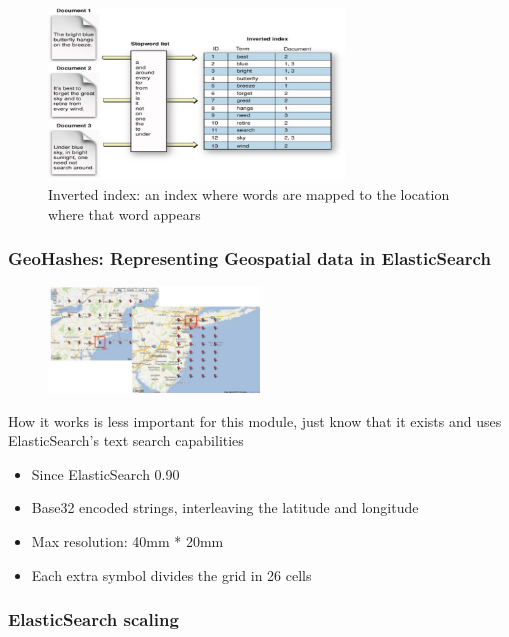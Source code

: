 \documentclass{article}
\begin{document}
\begin{figure}[H]
    \centering
    \includegraphics[width=0.7\textwidth]{inverted-index.png}
    \caption{Inverted index: an index where words are mapped to the location where that word appears}
\end{figure}

\subsubsection{GeoHashes: Representing Geospatial data in ElasticSearch}

\begin{figure}[H]
    \centering
    \includegraphics[width=0.5\textwidth]{geohashes.jpg}
\end{figure}

How it works is less important for this module, just know that it exists and uses ElasticSearch's text search capabilities

\begin{itemize}
    \item Since ElasticSearch 0.90
    \item Base32 encoded strings, interleaving the latitude and longitude
    \item Max resolution: 40mm * 20mm
    \item Each extra symbol divides the grid in 26 cells
\end{itemize}

\subsubsection{ElasticSearch scaling}
\end{document}
